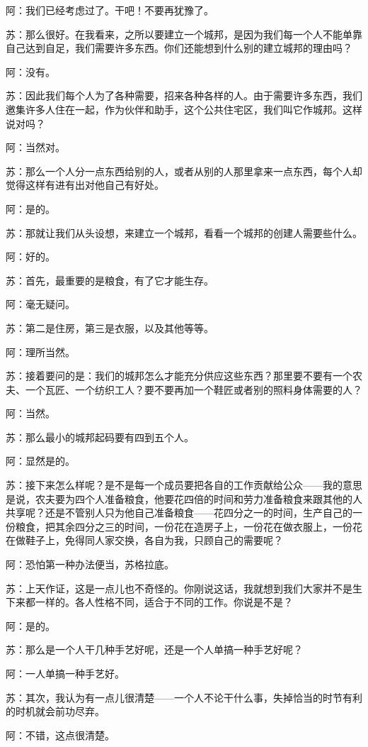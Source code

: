 \documentclass[12pt,oneside]{book}
\begin{document}
阿：我们已经考虑过了。干吧！不要再犹豫了。

苏：那么很好。在我看来，之所以要建立一个城邦，是因为我们每一个人不能单靠自己达到自足，我们需要许多东西。你们还能想到什么别的建立城邦的理由吗？

阿：没有。

苏：因此我们每个人为了各种需要，招来各种各样的人。由于需要许多东西，我们邀集许多人住在一起，作为伙伴和助手，这个公共住宅区，我们叫它作城邦。这样说对吗？

阿：当然对。

苏：那么一个人分一点东西给别的人，或者从别的人那里拿来一点东西，每个人却觉得这样有进有出对他自己有好处。

阿：是的。

苏：那就让我们从头设想，来建立一个城邦，看看一个城邦的创建人需要些什么。

阿：好的。

苏：首先，最重要的是粮食，有了它才能生存。

阿：毫无疑问。

苏：第二是住房，第三是衣服，以及其他等等。

阿：理所当然。

苏：接着要问的是：我们的城邦怎么才能充分供应这些东西？那里要不要有一个农夫、一个瓦匠、一个纺织工人？要不要再加一个鞋匠或者别的照料身体需要的人？

阿：当然。

苏：那么最小的城邦起码要有四到五个人。

阿：显然是的。

苏：接下来怎么样呢？是不是每一个成员要把各自的工作贡献给公众——我的意思是说，农夫要为四个人准备粮食，他要花四倍的时间和劳力准备粮食来跟其他的人共享呢？还是不管别人只为他自己准备粮食——花四分之一的时间，生产自己的一份粮食，把其余四分之三的时间，一份花在造房子上，一份花在做衣服上，一份花在做鞋子上，免得同人家交换，各自为我，只顾自己的需要呢？

阿：恐怕第一种办法便当，苏格拉底。

苏：上天作证，这是一点儿也不奇怪的。你刚说这话，我就想到我们大家并不是生下来都一样的。各人性格不同，适合于不同的工作。你说是不是？

阿：是的。

苏：那么是一个人干几种手艺好呢，还是一个人单搞一种手艺好呢？

阿：一人单搞一种手艺好。

苏：其次，我认为有一点儿很清楚——一个人不论干什么事，失掉恰当的时节有利的时机就会前功尽弃。

阿：不错，这点很清楚。
\end{document}
